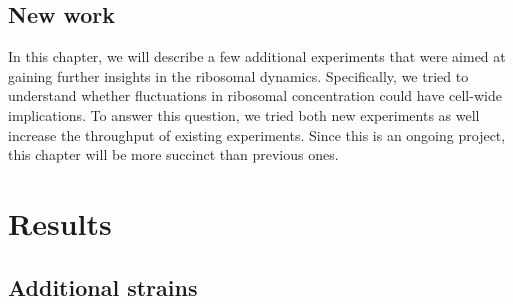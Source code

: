 \subsection*{New work}

In this chapter, we will describe a few additional experiments that were aimed at gaining further insights in the ribosomal dynamics.
Specifically, we tried to understand whether fluctuations in ribosomal concentration could have cell-wide implications.
%
To answer this question, we tried both new experiments as well increase the throughput of existing experiments.
%
Since this is an ongoing project, this chapter will be more succinct than previous ones.

\section*{Results}

\subsection*{Additional strains}



